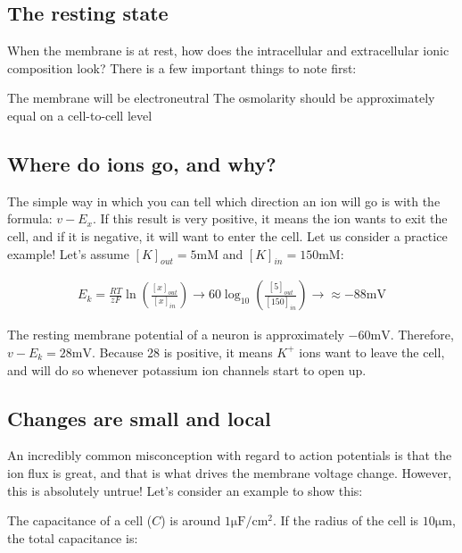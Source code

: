 \documentclass[12pt]{amsart}
\begin{document}
\subsection{The resting state} When the membrane is at rest, how does the intracellular and extracellular ionic composition look? There is a few important things to note first:

\begin{outline}[enumerate]
\1 The membrane will be electroneutral
\1 The osmolarity should be approximately equal on a cell-to-cell level

\end{outline}

\subsection{Where do ions go, and why?} The simple way in which you can tell which direction an ion will go is with the formula: $v - E_x$. If this result is very positive, it means the ion wants to exit the cell, and if it is negative, it will want to enter the cell. Let us consider a practice example! Let's assume $[K]_{out} = 5\mathrm{mM}$ and $[K]_{in} = 150\mathrm{mM}$: 


\begin{equation} \label{eq8}
\begin{split}
E_k = \frac{RT}{zF}\ln(\frac{[x]_{out}}{[x]_{in}}) \rightarrow 60\log_{10}(\frac{[5]_{out}}{[150]_{in}}) \rightarrow \approx -88 \mathrm{mV}
\end{split}
\end{equation}

\bigskip

 The resting membrane potential of a neuron is approximately $-60\mathrm{mV}$. Therefore, $v - E_k = 28\mathrm{mV}$. Because 28 is positive, it means $K^+$ ions want to leave the cell, and will do so whenever potassium ion channels start to open up.  

\subsection{Changes are small and local} An incredibly common misconception with regard to action potentials is that the ion flux is great, and that is what drives the membrane voltage change. However, this is absolutely untrue! Let's consider an example to show this: 

\bigskip


    The capacitance of a cell ($C$) is around $1\mathrm{\mu F}/\mathrm{cm}^2$. If the radius of the cell is $10\mathrm{\mu m}$, the total capacitance is:
\end{document}
